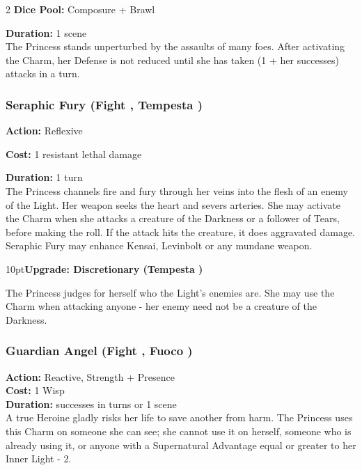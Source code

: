 \begin{multicols}{2}
\noindent \textbf{Dice Pool:}  Composure + Brawl

\noindent \textbf{Duration:} 1 scene\\

\noindent The Princess stands unperturbed by the assaults of many foes. After activating the Charm, her Defense is not reduced until she has taken (1 + her successes) attacks in a turn.

\subsubsection*{Seraphic Fury (Fight \textbullet\textbullet, Tempesta \textbullet\textbullet)}

\noindent \textbf{Action:} Reflexive

\noindent \textbf{Cost:} 1 resistant lethal damage

\noindent \textbf{Duration:} 1 turn\\

The Princess channels fire and fury through her veins into the flesh of an enemy of the Light. Her weapon seeks the heart and severs arteries. She may activate the Charm when she attacks a creature of the Darkness or a follower of Tears, before making the roll. If the attack hits the creature, it does aggravated damage. Seraphic Fury may enhance Kensai, Levinbolt or any mundane weapon.

\begin{myindentpar}{10pt}\textbf{Upgrade: Discretionary (Tempesta \textbullet\textbullet\textbullet\textbullet)}

The Princess judges for herself who the Light’s enemies are. She may use the Charm when attacking anyone - her enemy need not be a creature of the Darkness.\end{myindentpar}

\subsubsection*{Guardian Angel (Fight \textbullet\textbullet, Fuoco \textbullet)}
\noindent \textbf{Action:} Reactive, Strength + Presence\\

\noindent \textbf{Cost:} 1 Wisp\\

\noindent \textbf{Duration:} successes in turns or 1 scene\\


A true Heroine gladly risks her life to save another from harm. The Princess uses this Charm on someone she can see; she cannot use it on herself, someone who is already using it, or anyone with a Supernatural Advantage equal or greater to her Inner Light - 2.


\end{multicols}
